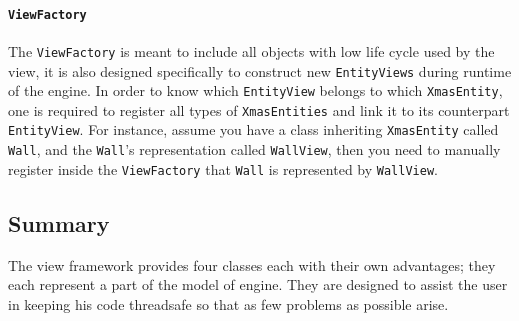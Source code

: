 \paragraph*{\texttt{ViewFactory}}

The \texttt{ViewFactory} is meant to include all objects with low
life cycle used by the view, it is also designed specifically to construct
new \texttt{EntityViews} during runtime of the engine. In order to
know which \texttt{EntityView} belongs to which \texttt{XmasEntity},
one is required to register all types of \texttt{XmasEntities} and
link it to its counterpart \texttt{EntityView}. For instance, assume
you have a class inheriting \texttt{XmasEntity} called \texttt{Wall},
and the \texttt{Wall}\textquoteright{}s representation called \texttt{WallView},
then you need to manually register inside the \texttt{ViewFactory}
that \texttt{Wall} is represented by \texttt{WallView}. 


\subsection*{Summary}

The view framework provides four classes each with their own advantages;
they each represent a part of the model of engine. They are designed
to assist the user in keeping his code threadsafe so that as few problems
as possible arise.
